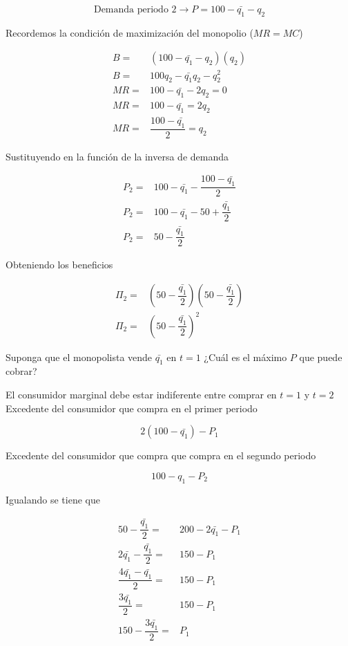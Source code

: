 \documentclass[letterpaper,12pt,twocolumn]{report}
\begin{document}
$$\text{Demanda periodo 2} \rightarrow P=100-\bar{q_1}-q_2$$

Recordemos la condición de maximización del monopolio ($MR=MC$)

\begin{align*}
	B =& (100-\bar{q_1}-q_2)(q_2) \\
	B =& 100q_2-\bar{q_1}q_2-q_2^2 \\
	MR =& 100-\bar{q_1}-2q_2 = 0 \\
	MR =& 100-\bar{q_1}=2q_2\\
	MR = & \dfrac{100-\bar{q_1}}{2}=q_2
\end{align*}

Sustituyendo en la función de la inversa de demanda

\begin{align*}
	P_2 = & 100-\bar{q_1} - \dfrac{100-\bar{q_1}}{2}\\
	P_2 =& 100-\bar{q_1}-50+\dfrac{\bar{q_1}}{2}\\
	P_2=& 50-\dfrac{\bar{q_1}}{2}
\end{align*}

Obteniendo los beneficios

\begin{align*}
	\Pi_2 =& \left( 50-\dfrac{\bar{q_1}}{2}\right) \left( 50-\dfrac{\bar{q_1}}{2}\right)  \\
	\Pi_2 =& \left( 50-\dfrac{\bar{q_1}}{2}\right) ^2
\end{align*}

Suponga que el monopolista vende $\bar{q_1}$ en $t=1$ ¿Cuál es el máximo $P$ que puede cobrar?

El consumidor marginal debe estar indiferente entre comprar en $t=1$ y $t=2$
Excedente del consumidor que compra en el primer periodo

$$
2(100-\bar{q_1})-P_1
$$

Excedente del consumidor que compra que compra en el segundo periodo 

$$ 100-q_1-P_2$$

Igualando se tiene que 

\begin{align*}
	50- \dfrac{\bar{q_1}}{2} =& 200- 2\bar{q_1}-P_1\\
	2\bar{q_1}-\dfrac{\bar{q_1}}{2}=&  150-P_1\\
	\dfrac{4\bar{q_1}-\bar{q_1}}{2}=&  150-P_1	\\
	\dfrac{3\bar{q_1}}{2}=& 150-P_1\\
	150-\dfrac{3\bar{q_1}}{2} =& P_1
\end{align*}
\end{document}
